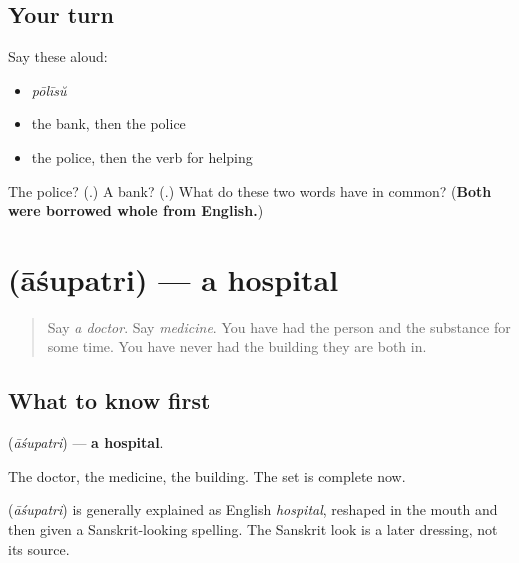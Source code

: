\subsection*{Your turn}
Say these aloud:

\begin{itemize}
\raggedright
  \item \emph{pōlīsŭ}
  \item the bank, then the police
  \item the police, then the verb for helping
\end{itemize}

\begin{tcolorbox}[breakable,colback=teal!4,colframe=teal!35!black,title={Before you move on}]
The police? (\textbf{}.) A bank? (\textbf{}.) What do these two words have in common? (\textbf{Both were borrowed whole from English.})
\end{tcolorbox}
\section[\texorpdfstring{\ml{ആശുപത്രി} (āśupatri)}{ആശുപത്രി (āśupatri)}]{ (āśupatri) — a hospital}

\label{lesson:ML-C112-aashupathri}



\begin{quote}
Say \emph{a doctor}. Say \emph{medicine}. You have had the person and the substance for some time. You have never had the building they are both in.
\end{quote}

\subsection*{What to know first}
\textbf{} (\emph{āśupatri}) — \textbf{a hospital}.

The doctor, the medicine, the building. The set is complete now.

\begin{cousinweb}
\textbf{} (\emph{āśupatri}) is generally explained as English \emph{hospital}, reshaped in the mouth and then given a Sanskrit-looking spelling. The Sanskrit look is a later dressing, not its source.
\end{cousinweb}

